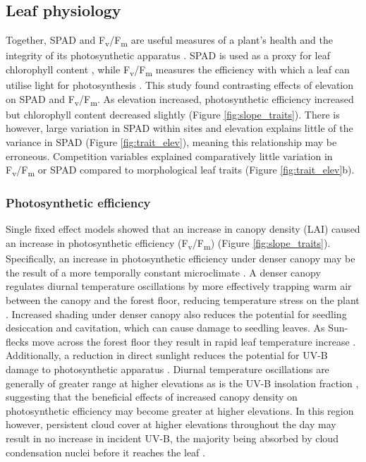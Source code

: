 \documentclass[a4paper,10pt,]{report}
\begin{document}
\subsection*{Leaf physiology}
Together, SPAD and F\textsubscript{v}/F\textsubscript{m} are useful measures of a plant's health and the integrity of its photosynthetic apparatus \citep{Clark2000}. SPAD is used as a proxy for leaf chlorophyll content \citep{Richardson2002}, while F\textsubscript{v}/F\textsubscript{m} measures the efficiency with which a leaf can utilise light for photosynthesis \citep{Maxwell2000}. This study found contrasting effects of elevation on SPAD and F\textsubscript{v}/F\textsubscript{m}. As elevation increased, photosynthetic efficiency increased but chlorophyll content decreased slightly (Figure \ref{fig:slope_traits}). There is however, large variation in SPAD within sites and elevation explains little of the variance in SPAD (Figure \ref{fig:trait_elev}), meaning this relationship may be erroneous. Competition variables explained comparatively little variation in F\textsubscript{v}/F\textsubscript{m} or SPAD compared to morphological leaf traits (Figure \ref{fig:trait_elev}b).

\subsubsection*{Photosynthetic efficiency}
Single fixed effect models showed that an increase in canopy density (LAI) caused an increase in photosynthetic efficiency (F\textsubscript{v}/F\textsubscript{m}) (Figure \ref{fig:slope_traits}). Specifically, an increase in photosynthetic efficiency under denser canopy may be the result of a more temporally constant microclimate \citep{Amissah2015}. A denser canopy regulates diurnal temperature oscillations by more effectively trapping warm air between the canopy and the forest floor, reducing temperature stress on the plant \citep{Larcher2003}. Increased shading under denser canopy also reduces the potential for seedling desiccation and cavitation, which can cause damage to seedling leaves. As Sun-flecks move across the forest floor they result in rapid leaf temperature increase \citep{Rozendaal2006, Poorter2010}. Additionally, a reduction in direct sunlight reduces the potential for UV-B damage to photosynthetic apparatus \citep{Dobrikova2013}. Diurnal temperature oscillations are generally of greater range at higher elevations \citep{Seidel2005} as is the UV-B insolation fraction \citep{Piazena1996}, suggesting that the beneficial effects of increased canopy density on photosynthetic efficiency may become greater at higher elevations. In this region however, persistent cloud cover at higher elevations throughout the day may result in no increase in incident UV-B, the majority being absorbed by cloud condensation nuclei before it reaches the leaf \citep{Flint2003}.
\end{document}
